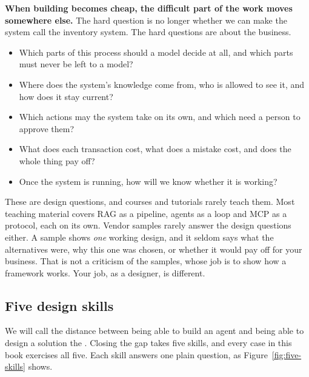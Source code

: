\textbf{When building becomes cheap, the difficult part of the work moves somewhere else.} The hard question is no longer whether we can make the system call the inventory system. The hard questions are about the business. 
\begin{itemize}
\item Which parts of this process should a model decide at all, and which parts must never be left to a model? 
\item Where does the system's knowledge come from, who is allowed to see it, and how does it stay current? 
\item Which actions may the system take on its own, and which need a person to approve them? 
\item What does each transaction cost, what does a mistake cost, and does the whole thing pay off? 
\item Once the system is running, how will we know whether it is working?
\end{itemize}

These are design questions, and courses and tutorials rarely teach them. Most teaching material covers RAG as a pipeline, agents as a loop and MCP as a protocol, each on its own. Vendor samples rarely answer the design questions either. A sample shows \emph{one} working design, and it seldom says what the alternatives were, why this one was chosen, or whether it would pay off for your business. That is not a criticism of the samples, whose job is to show how a framework works. Your job, as a designer, is different.

\subsection{Five design skills}

We will call the distance between being able to build an agent and being able to design a solution the . Closing the gap takes five skills, and every case in this book exercises all five. Each skill answers one plain question, as Figure~\ref{fig:five-skills} shows.

